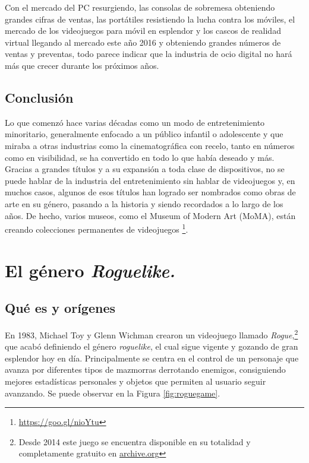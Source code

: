 Con el mercado del PC resurgiendo, las consolas de sobremesa obteniendo grandes cifras de ventas, las portátiles resistiendo la lucha contra los móviles, el mercado de los videojuegos para móvil en esplendor y los cascos de realidad virtual llegando al mercado este año 2016 y obteniendo grandes números de ventas y preventas, todo parece indicar que la industria de ocio digital no hará más que crecer durante los próximos años.

\subsection{Conclusión}

Lo que comenzó hace varias décadas como un modo de entretenimiento minoritario, generalmente enfocado a un público infantil o adolescente y que miraba a otras industrias como la cinematográfica con recelo, tanto en números como en visibilidad, se ha convertido en todo lo que había deseado y más. Gracias a grandes títulos y a su expansión a toda clase de dispositivos, no se puede hablar de la industria del entretenimiento sin hablar de videojuegos y, en muchos casos, algunos de esos títulos han logrado ser nombrados como obras de arte en su género, pasando a la historia y siendo recordados a lo largo de los años.
De hecho, varios museos, como el Museum of Modern Art (MoMA), están creando colecciones permanentes de videojuegos \footnote{\url{https://goo.gl/nioYtu}}.

\section{El género \textit{Roguelike.}}
\label{sec:roguelikeinformacion}

\subsection{Qué es y orígenes}
\label{game:roguelikeis}

En 1983, Michael Toy y Glenn Wichman crearon un videojuego llamado \textit{Rogue},\footnote{Desde 2014 este juego se encuentra disponible en su totalidad y completamente gratuito en \href{https://archive.org/details/msdos_Rogue_1983}{archive.org}} que acabó definiendo el género \textit{roguelike}, el cual sigue vigente y gozando de gran esplendor hoy en día. Principalmente se centra en el control de un personaje que avanza por diferentes tipos de mazmorras derrotando enemigos, consiguiendo mejores estadísticas personales y objetos que permiten al usuario seguir avanzando. Se puede observar en la Figura \ref{fig:roguegame}.

